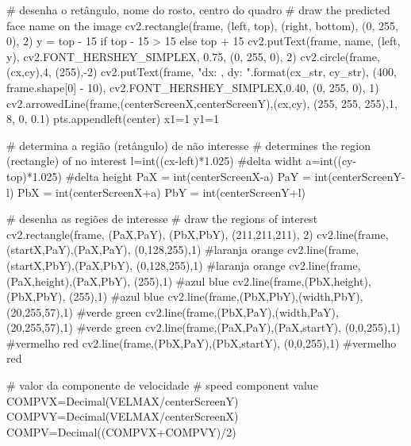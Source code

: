 \begin{apendicesenv}
\begin{python_}
		# desenha o retângulo, nome do rosto, centro do quadro
		# draw the predicted face name on the image
		cv2.rectangle(frame, (left, top), (right, bottom),
		(0, 255, 0), 2)
		y = top - 15 if top - 15 > 15 else top + 15
		cv2.putText(frame, name, (left, y), cv2.FONT_HERSHEY_SIMPLEX,
		0.75, (0, 255, 0), 2)
		cv2.circle(frame,(cx,cy),4, (255),-2)
		cv2.putText(frame, "dx: {}, dy: {}".format(cx_str, cy_str),
		(400, frame.shape[0] - 10), cv2.FONT_HERSHEY_SIMPLEX,0.40, (0, 255, 0), 1)
		cv2.arrowedLine(frame,(centerScreenX,centerScreenY),(cx,cy), 
		(255, 255, 255),1, 8, 0, 0.1)
		pts.appendleft(center)
		x1=1
		y1=1
		
		
		# determina a região (retângulo) de não interesse  
		# determines the region (rectangle) of no interest
		l=int((cx-left)*1.025) #delta widht
		a=int((cy-top)*1.025) #delta height
		PaX = int(centerScreenX-a)
		PaY = int(centerScreenY-l)
		PbX = int(centerScreenX+a)
		PbY = int(centerScreenY+l)
		
		# desenha as regiões de interesse	
		# draw the regions of interest
		cv2.rectangle(frame, (PaX,PaY), (PbX,PbY), (211,211,211), 2)
		cv2.line(frame,(startX,PaY),(PaX,PaY), (0,128,255),1) #laranja orange
		cv2.line(frame,(startX,PbY),(PaX,PbY), (0,128,255),1) #laranja orange
		cv2.line(frame,(PaX,height),(PaX,PbY), (255),1) #azul blue
		cv2.line(frame,(PbX,height),(PbX,PbY), (255),1) #azul blue
		cv2.line(frame,(PbX,PbY),(width,PbY), (20,255,57),1) #verde green
		cv2.line(frame,(PbX,PaY),(width,PaY), (20,255,57),1) #verde green
		cv2.line(frame,(PaX,PaY),(PaX,startY), (0,0,255),1) #vermelho red
		cv2.line(frame,(PbX,PaY),(PbX,startY), (0,0,255),1) #vermelho red
		
		# valor da componente de velocidade
		# speed component value
		COMPVX=Decimal(VELMAX/centerScreenY)
		COMPVY=Decimal(VELMAX/centerScreenX)
		COMPV=Decimal((COMPVX+COMPVY)/2)
		

\end{python_}
\end{apendicesenv}
